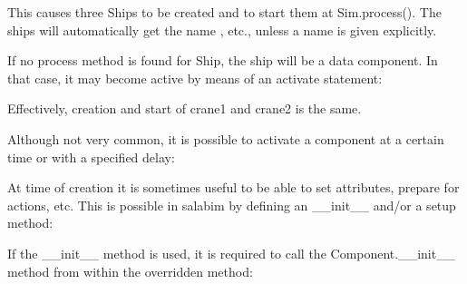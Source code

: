\documentclass[letterpaper,10pt,english]{sphinxmanual}
\begin{document}
This causes three Ships to be created and to start them at Sim.process().
The ships will automatically get the name , etc., unless a name
is given explicitly.

If no process method is found for Ship, the ship will be a data component.
In that case, it may become active by means of an activate statement:

\begin{sphinxVerbatim}[commandchars=\\\{\}]
 
     
         

  

  
\end{sphinxVerbatim}

Effectively, creation and start of crane1 and crane2 is the same.

Although not very common, it is possible to activate a component at a certain time or with a
specified delay:

\begin{sphinxVerbatim}[commandchars=\\\{\}]
\end{sphinxVerbatim}

At time of creation it is sometimes useful to be able to set attributes, prepare for actions, etc.
This is possible in salabim by defining an \_\_init\_\_ and/or a setup method:

If the \_\_init\_\_ method is used, it is required to call the Component.\_\_init\_\_ method from within the
overridden method:
\end{document}
